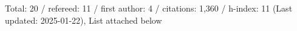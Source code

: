 Total: 20 / refereed: 11 / first author: 4 / citations: 1,360 / h-index: 11 (Last updated: 2025-01-22), List attached below